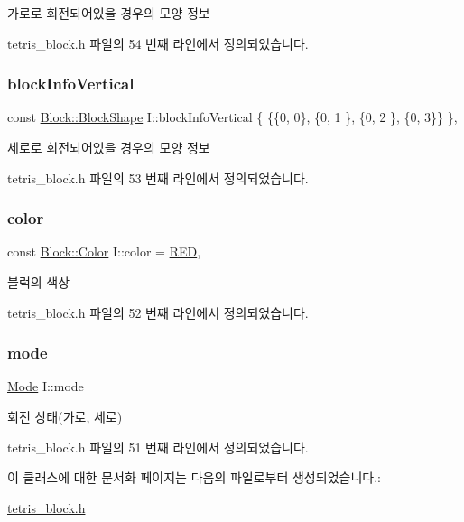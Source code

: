 가로로 회전되어있을 경우의 모양 정보 



tetris\+\_\+block.\+h 파일의 54 번째 라인에서 정의되었습니다.

\mbox{\label{class_i_a78fdc2abb810f708c2595846c74ad1ca}} 
\subsubsection{\texorpdfstring{block\+Info\+Vertical}{blockInfoVertical}}
{\footnotesize\ttfamily const \mbox{\hyperlink{class_block_aca5d951639f113e2ebd7856209d6b9ab}{Block\+::\+Block\+Shape}} I\+::block\+Info\+Vertical \{ \{\{0, 0\}, \{0, 1 \}, \{0, 2 \}, \{0, 3\}\} \}\hspace{0.3cm}{\ttfamily [static]}, {\ttfamily [private]}}



세로로 회전되어있을 경우의 모양 정보 



tetris\+\_\+block.\+h 파일의 53 번째 라인에서 정의되었습니다.

\mbox{\label{class_i_a526ab692f8757d9d3ff3da5ca231b8a0}} 
\subsubsection{\texorpdfstring{color}{color}}
{\footnotesize\ttfamily const \mbox{\hyperlink{class_block_ad054b4ac51df79aa910040b2a2fdf7b5}{Block\+::\+Color}} I\+::color = \mbox{\hyperlink{class_block_ad054b4ac51df79aa910040b2a2fdf7b5ac3d067e89682bb3d91db42beb7c68062}{R\+ED}}\hspace{0.3cm}{\ttfamily [static]}, {\ttfamily [private]}}



블럭의 색상 



tetris\+\_\+block.\+h 파일의 52 번째 라인에서 정의되었습니다.

\mbox{\label{class_i_a97884fed99bc779803178b5c3f4bc02d}} 
\subsubsection{\texorpdfstring{mode}{mode}}
{\footnotesize\ttfamily \mbox{\hyperlink{class_block_a33a96023993478ad4b52426188454765}{Mode}} I\+::mode\hspace{0.3cm}{\ttfamily [private]}}



회전 상태(가로, 세로) 



tetris\+\_\+block.\+h 파일의 51 번째 라인에서 정의되었습니다.



이 클래스에 대한 문서화 페이지는 다음의 파일로부터 생성되었습니다.\+:\begin{DoxyCompactItemize}
\item 
\mbox{\hyperlink{tetris__block_8h}{tetris\+\_\+block.\+h}}\end{DoxyCompactItemize}

